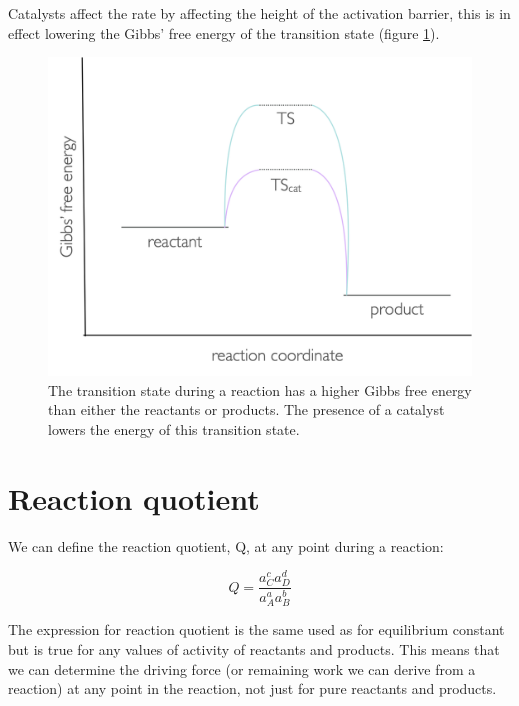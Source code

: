 \documentclass[
]{book}
\begin{document}
Catalysts affect the rate by affecting the height of the activation barrier, this is in effect lowering the Gibbs' free energy of the transition state (figure \ref{fig:catalyst}).

\begin{figure}

{\centering \includegraphics[width=1\linewidth]{images/catalyst} 

}

\caption{The transition state during a reaction has a higher Gibbs free energy than either the reactants or products. The presence of a catalyst lowers the energy of this transition state.}\label{fig:catalyst}
\end{figure}

\hypertarget{sec:quotient}{%
\section{Reaction quotient}\label{sec:quotient}}

We can define the reaction quotient, Q, at any point during a reaction:

\begin{equation}
Q = \frac{a_C^ca_D^d}{a_A^aa_B^b}
\label{eq:quotient}
\end{equation}

The expression for reaction quotient is the same used as for equilibrium constant but is true for any values of activity of reactants and products. This means that we can determine the driving force (or remaining work we can derive from a reaction) at any point in the reaction, not just for pure reactants and products.
\end{document}
